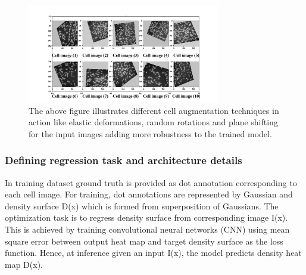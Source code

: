 \documentclass[runningheads]{llncs}
\begin{document}
\begin{figure}[!h]
\centering
\includegraphics[width=0.75\textwidth]{data-aug-image.png}
\caption{The above figure illustrates different cell augmentation techniques in action like elastic deformations, random rotations and plane shifting for the input images adding more robustness to the trained model.}
\label{fig7}
\end{figure}

\subsubsection{Defining regression task and architecture details}

In training dataset ground truth is provided as dot annotation corresponding to each cell image. For training, dot annotations are represented by Gaussian and density surface D(x) which is formed from superposition of Gaussians. The optimization task is to regress density surface from corresponding image I(x). This is achieved by training convolutional neural networks (CNN) using mean square error between output heat map and target density surface as the loss function. Hence, at inference given an input I(x), the model predicts density heat map D(x).
\end{document}
